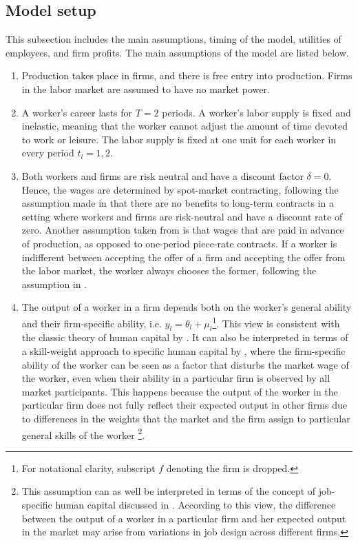 \documentclass[12pt]{article}
\begin{document}
\subsection{Model setup}
This subsection includes the main assumptions, timing of the model, utilities of employees, and firm profits. The main assumptions of the model are listed below.
\begin{enumerate}[label={A}{\arabic*}.]
	\item Production takes place in firms, and there is free entry into production. Firms in the labor market are assumed to have no market power.
	\item A worker's career lasts for $T = 2$ periods. A worker's labor supply is fixed and inelastic, meaning that the worker cannot adjust the amount of time devoted to work or leisure. The labor supply is fixed at one unit for each worker in every period $t_l = 1,2$.
	\item Both workers and firms are risk neutral and have a discount factor $\delta = 0$. Hence, the wages are determined by spot-market contracting, following the assumption made in \cite{gibbons1999theory} that there are no benefits to long-term contracts in a setting where workers and firms are risk-neutral and have a discount rate of zero. Another assumption taken from \cite{gibbons1999theory} is that wages that are paid in advance of production, as opposed to one-period piece-rate contracts. If a worker is indifferent between accepting the offer of a firm and accepting the offer from the labor market, the worker always chooses the former, following the assumption in \cite{ekinci2016employee}.
    \item The output of a worker in a firm depends both on the worker's general ability and their firm-specific ability, i.e. $y_{l} = \theta_l + \mu_l$\footnote{For notational clarity, subscript $f$ denoting the firm is dropped.}. This view is consistent with the classic theory of human capital by \cite{becker1962investment}. It can also be interpreted in terms of a skill-weight approach to specific human capital by \cite{lazear2009firm}, where the firm-specific ability of the worker can be seen as a factor that disturbs the market wage of the worker, even when their ability in a particular firm is observed by all market participants. This happens because the output of the worker in the particular firm does not fully reflect their expected output in other firms due to differences in the weights that the market and the firm assign to particular general skills of the worker \footnote{This assumption can as well be interpreted in terms of the concept of job-specific human capital discussed in \cite{gibbons2004task}. According to this view, the difference between the output of a worker in a particular firm and her expected output in the market may arise from variations in job design across different firms.}. 

\end{enumerate}
\end{document}
